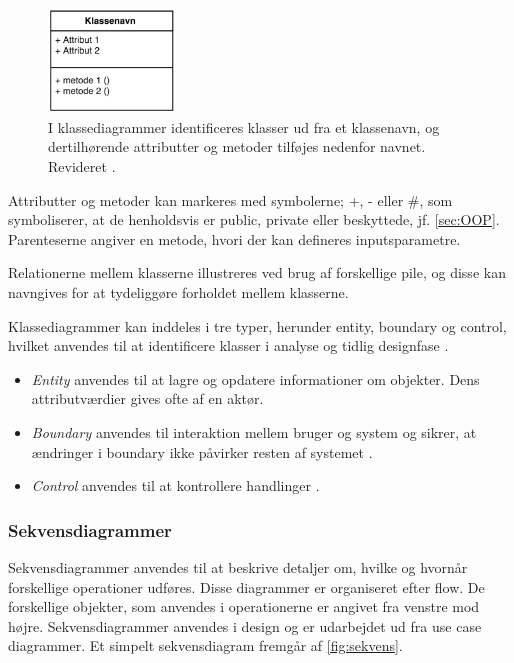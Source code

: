 \begin{figure} [H]
\centering
\includegraphics[width=0.3\textwidth]{figures/klassediag}
\caption{I klassediagrammer identificeres klasser ud fra et klassenavn, og dertilhørende attributter og metoder tilføjes nedenfor navnet. Revideret \cite{Fowler2004}.}
\label{fig:klassediagram}
\end{figure}

\noindent
Attributter og metoder kan markeres med symbolerne; +, - eller \#, som symboliserer, at de henholdsvis er public, private eller beskyttede, jf. \autoref{sec:OOP}. Parenteserne angiver en metode, hvori der kan defineres inputsparametre.

Relationerne mellem klasserne illustreres ved brug af forskellige pile, og disse kan navngives for at tydeliggøre forholdet mellem  klasserne.

Klassediagrammer kan inddeles i tre typer, herunder entity, boundary og control, hvilket anvendes til at identificere klasser i analyse og tidlig designfase \cite{RSC2002}.

\begin{itemize}
\item \textit{Entity} anvendes til at lagre og opdatere informationer om objekter. Dens attributværdier gives ofte af en aktør.\cite{RSC2002}
\item \textit{Boundary} anvendes til interaktion mellem bruger og system og sikrer, at ændringer i boundary ikke påvirker resten af systemet \cite{RSC2002}.
\item \textit{Control} anvendes til at kontrollere handlinger \cite{RSC2002}. 
\end{itemize}
\newpage

\subsubsection{Sekvensdiagrammer}
Sekvensdiagrammer anvendes til at beskrive detaljer om, hvilke og hvornår forskellige operationer udføres. Disse diagrammer er organiseret efter flow. De forskellige objekter, som anvendes i operationerne er angivet fra venstre mod højre. Sekvensdiagrammer anvendes i design og er udarbejdet ud fra use case diagrammer.\cite{Brahma2015} Et simpelt sekvensdiagram fremgår af \autoref{fig:sekvens}.

